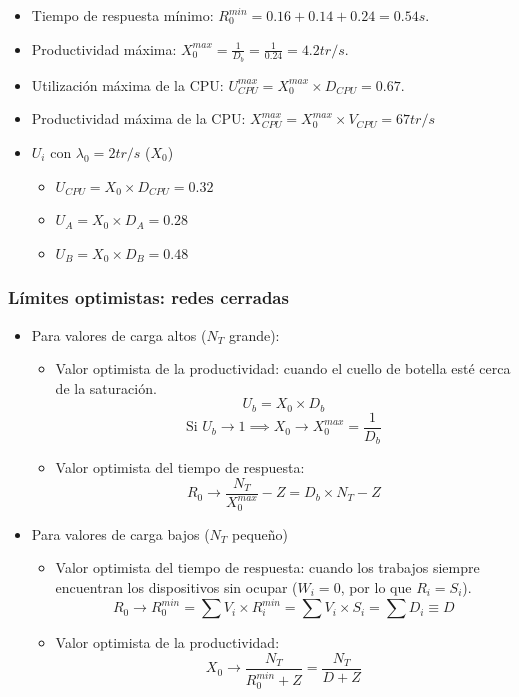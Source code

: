 \documentclass[12pt,spanish]{article}
\begin{document}
\begin{itemize}
	\item Tiempo de respuesta mínimo: $R_0^{min} = 0.16 + 0.14 + 0.24 = 0.54 s$.
	\item Productividad máxima: $X_0^{max}=\frac{1}{D_b}=\frac{1}{0.24}=4.2 tr/s$.
	\item Utilización máxima de la CPU: $U_{CPU}^{max}=X_{0}^{max} \times D_{CPU} = 0.67$.
	\item Productividad máxima de la CPU: $X_{CPU}^{max}= X_0^{max} \times V_{CPU} = 67 tr/s$
	\item $U_i$ con $\lambda_0=2tr/s$ ($X_0$)
		\begin{itemize}
			\item $U_{CPU} = X_0 \times D_{CPU} = 0.32$
			\item $U_A = X_0 \times D_A = 0.28$
			\item $U_B = X_0 \times D_B = 0.48$
		\end{itemize}
\end{itemize}

\subsubsection{Límites optimistas: redes cerradas}

\begin{itemize}
	\item Para valores de carga altos ($N_T$ grande):
		\begin{itemize}
			\item Valor optimista de la productividad: cuando el cuello de botella esté cerca de la saturación.
			\begin{equation*}
				U_b= X_0 \times D_b
			\end{equation*}
			\begin{equation*}
				\text{Si } U_b \rightarrow 1 \implies X_0 \rightarrow X_0^{max}=\frac{1}{D_b}
			\end{equation*}
		\item Valor optimista del tiempo de respuesta:
		\begin{equation*}
			R_0 \to \frac{N_T}{X_0^{max}}-Z = D_b \times N_T - Z
		\end{equation*}
		\end{itemize}
	\item Para valores de carga bajos ($N_T$ pequeño)
		\begin{itemize}
			\item Valor optimista del tiempo de respuesta: cuando los trabajos siempre encuentran los dispositivos sin ocupar ($W_i=0$, por lo que $R_i=S_i$).
			\begin{equation*}
				R_0 \to R_0^{min} = \sum{V_i \times R_i^{min} = \sum{V_i \times S_i} = \sum{D_i} \equiv D}
			\end{equation*}
			\item Valor optimista de la productividad:
			\begin{equation*}
				X_0 \to \frac{N_T}{R_0^{min} + Z}=\frac{N_T}{D + Z}
			\end{equation*}
		\end{itemize}
\end{itemize}
\end{document}
